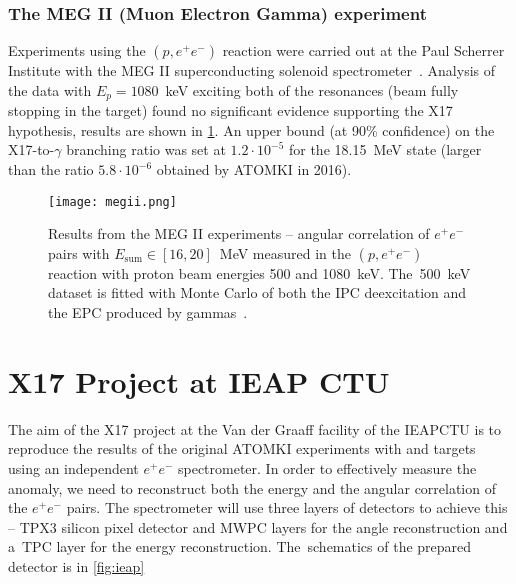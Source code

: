 			\subsubsection{The MEG II (Muon Electron Gamma) experiment}
				Experiments using the $(p,e^+e^-)$ reaction were carried out at the Paul Scherrer Institute with the MEG II superconducting solenoid spectrometer~\cite{megii}. Analysis of the data with $E_p = 1080$~keV exciting both of the resonances (beam fully stopping in the target) found no significant evidence supporting the X17 hypothesis, results are shown in \cref{fig:megii}. An upper bound (at 90\% confidence) on the X17\nobreakdash-to\nobreakdash-$\gamma$ branching ratio was set at $1.2\cdot10^{-5}$ for the 18.15~MeV state (larger than the ratio $5.8\cdot10^{-6}$ obtained by ATOMKI in 2016).
				
				\begin{figure}
					\centering
					\texttt{[image: megii.png]}
					\caption{Results from the MEG II experiments -- angular correlation of $e^+e^-$ pairs with $E_\text{sum} \in [16,20]$~MeV measured in the $(p,e^+e^-)$ reaction with proton beam energies 500 and 1080~keV. The~500~keV dataset is fitted with Monte Carlo of both the \ac{IPC} deexcitation and the \ac{EPC} produced by gammas~\cite{megii}.}
					\label{fig:megii}
				\end{figure}
			
	
	\section{X17 Project at IEAP CTU}
	\label{sec:IEAP}
		The aim of the X17 project at the Van der Graaff facility of the \acl{IEAPCTU} is to reproduce the results of the original ATOMKI experiments with  and  targets using an independent $e^+e^-$ spectrometer. In order to effectively measure the anomaly, we need to reconstruct both the energy and the angular correlation of the $e^+e^-$ pairs. The spectrometer will use three layers of detectors to achieve this -- \acf{TPX3} silicon pixel detector and \acf{MWPC} layers for the angle reconstruction and a~\acf{TPC} layer for the energy reconstruction. The~schematics of the prepared detector is in \cref{fig:ieap}
			
